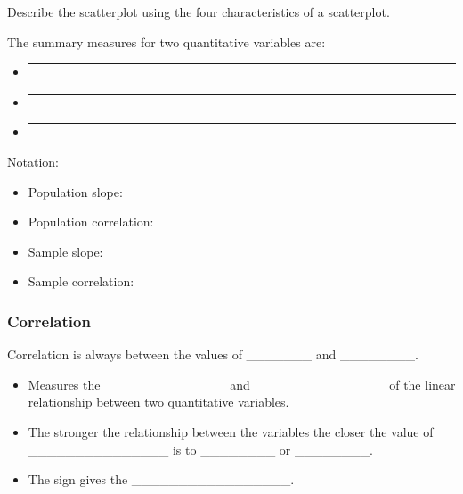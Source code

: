 \documentclass[
]{report}
\begin{document}
Describe the scatterplot using the four characteristics of a scatterplot.

\vspace{1in}


The summary measures for two quantitative variables are:

\begin{itemize}
\item
  \begin{center}\rule{0.5\linewidth}{0.5pt}\end{center}
\item
  \begin{center}\rule{0.5\linewidth}{0.5pt}\end{center}
\item
  \begin{center}\rule{0.5\linewidth}{0.5pt}\end{center}
\end{itemize}


Notation:

\begin{itemize}
\item
  Population slope:
\item
  Population correlation:
\item
  Sample slope:
\item
  Sample correlation:
\end{itemize}

\subsubsection*{Correlation}\label{correlation}

Correlation is always between the values of \_\_\_\_\_\_\_ and \_\_\_\_\_\_\_\_.

\begin{itemize}
\item
  Measures the \_\_\_\_\_\_\_\_\_\_\_\_\_ and \_\_\_\_\_\_\_\_\_\_\_\_\_\_ of the linear relationship between two quantitative variables.
\item
  The stronger the relationship between the variables the closer the value of \_\_\_\_\_\_\_\_\_\_\_\_\_\_\_ is to \_\_\_\_\_\_\_\_ or \_\_\_\_\_\_\_\_.
\item
  The sign gives the \_\_\_\_\_\_\_\_\_\_\_\_\_\_\_\_\_.
\end{itemize}
\end{document}
